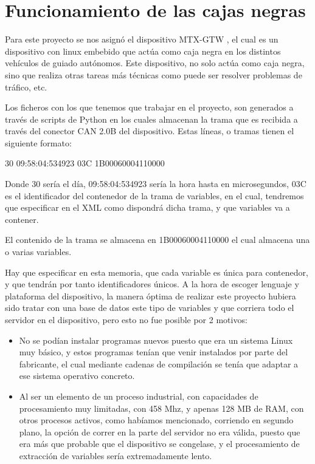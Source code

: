 
\section{Funcionamiento de las cajas negras}

Para este proyecto se nos asignó el dispositivo MTX-GTW \cite{gtx-mtx}, el cual es un dispositivo con linux embebido que actúa como caja negra en los distintos vehículos de guiado autónomos. Este dispositivo, no solo actúa como caja negra, sino que realiza otras tareas más técnicas como puede ser resolver problemas de tráfico, etc.

Los ficheros con los que tenemos que trabajar en el proyecto, son generados a través de scripts de Python en los cuales almacenan la trama que es recibida a través del conector CAN 2.0B \cite{CAN} del dispositivo.
Estas líneas, o tramas tienen el siguiente formato:

30 09:58:04:534923 03C 1B00060004110000


Donde 30 sería el día, 09:58:04:534923 sería la hora hasta en microsegundos, 03C es el identificador del contenedor de la trama de variables, en el cual, tendremos que especificar en el XML como dispondrá dicha trama, y que variables va a contener.

El contenido de la trama se almacena en 1B00060004110000 el cual almacena una o varias variables.

Hay que especificar en esta memoria, que cada variable es única para contenedor, y que tendrán por tanto identificadores únicos.
A la hora de escoger lenguaje y plataforma del dispositivo, la manera óptima de realizar este proyecto hubiera sido tratar con una base de datos este tipo de variables y que corriera todo el servidor en el dispositivo, pero esto no fue posible por 2 motivos:
\begin{itemize}
	\item No se podían instalar programas nuevos puesto que era un sistema Linux muy básico, y estos programas tenían que venir instalados por parte del fabricante, el cual mediante cadenas de compilación se tenía que adaptar a ese sistema operativo concreto.
	
	\item Al ser un elemento de un proceso industrial, con capacidades de procesamiento muy limitadas, con 458 Mhz, y apenas 128 MB de RAM, con otros procesos activos, como habíamos mencionado, corriendo en segundo plano, la opción de correr en la parte del servidor no era válida, puesto que era más que probable que el dispositivo se congelase, y el procesamiento de extracción de variables sería extremadamente lento.
	
\end{itemize}
